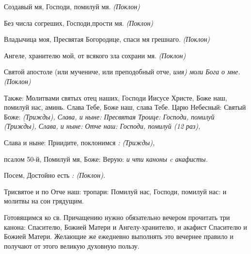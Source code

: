 Создавый мя, Господи, помилуй мя. \itshape (Поклон)


\normalfont{}




Без числа согреших, Господи,прости мя. \itshape (Поклон)


\normalfont{}




Владычица моя, Пресвятая Богородице, спаси мя грешнаго. \itshape (Поклон)


\normalfont{}




Ангеле, хранителю мой, от всякого зла сохрани мя. \itshape (Поклон)


\normalfont{}




Святой апостоле (или мучениче, или преподобный отче,  \itshape имя\normalfont{}) моли Бога о мне. \itshape (Поклон)




\normalfont{}







\bfseries 


Также\normalfont{}: Молитвами святых отец наших, Господи Иисусе Христе, Боже наш, помилуй нас, аминь. Слава Тебе, Боже наш, слава Тебе. Царю Небесный: Святый Боже: \itshape (Трижды\normalfont{}), Слава, и ныне: Пресвятая Троице: Господи, помилуй \itshape (Трижды\normalfont{}), Слава, и ныне: Отче наш: Господи, помилуй \itshape (12 раз\normalfont{}), 





Слава и ныне: Приидите, поклонимся \itshape: (Трижды\normalfont{}), 

псалом 50-й, Помилуй мя, Боже: Верую: \itshape и чти каноны c акафисты.






\normalfont{}


\bfseries 


Посем\normalfont{}, Достойно есть \itshape: (Поклон\normalfont{}). 

Трисвятое и по Отче наш: тропари: Помилуй нас, Господи, помилуй нас: и молитвы на сон грядущим. 






 \itshape


Готовящимся ко св. Причащению нужно обязательно вечером прочитать три канона: Спасителю, Божией Матери и Ангелу-хранителю, и акафист Спасителю и Божией Матери. Желающие же ежедневно выполнять это вечернее правило и получают от этого великую духовную пользу.

